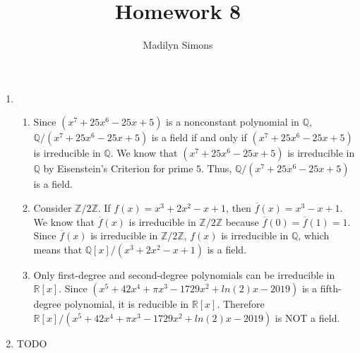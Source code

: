 \documentclass{article}
\title{Homework 8}
\author{Madilyn Simons}
\date{}
\begin{document}
\maketitle

\begin{enumerate}

\item
\begin{enumerate}

\item Since $(x^7 + 25x^6 - 25x + 5)$ is a nonconstant polynomial in
$\mathbb{Q}$, $\mathbb{Q}/(x^7 + 25x^6 - 25x + 5)$ is a field if and only if
$(x^7 + 25x^6 - 25x + 5)$ is irreducible in $\mathbb{Q}$.  We know that
$(x^7 + 25x^6 - 25x + 5)$ is irreducible in $\mathbb{Q}$ by Eisenstein's
Criterion for prime $5$.  Thus, $\mathbb{Q}/(x^7 + 25x^6 - 25x + 5)$ is a field.

\item Consider $\mathbb{Z}/2\mathbb{Z}$.  If $f(x) = x^3 + 2x^2 - x + 1$, then
$\overline{f}(x) = x^3 - x + 1$.  We know that $\overline{f}(x)$ is
irreducible in $\mathbb{Z}/2\mathbb{Z}$ because
$\overline{f}(0) = \overline{f}(1) = 1$.  Since $\overline{f}(x)$ is
irreducible in $\mathbb{Z}/2\mathbb{Z}$, $f(x)$ is irreducible in $\mathbb{Q}$,
which means that $\mathbb{Q}[x]/(x^3 + 2x^2 - x + 1)$ is a field.

\item Only first-degree and second-degree polynomials can be irreducible in
$\mathbb{R}[x]$.  Since $(x^5 + 42x^4 + \pi x^3 -1729x^2 + ln(2)x - 2019)$
is a fifth-degree polynomial, it is reducible in $\mathbb{R}[x]$.  Therefore
$\mathbb{R}[x]/(x^5 + 42x^4 + \pi x^3 -1729x^2 + ln(2)x - 2019)$ is NOT
a field.

\end{enumerate}

\item TODO

\end{enumerate}
\end{document}
